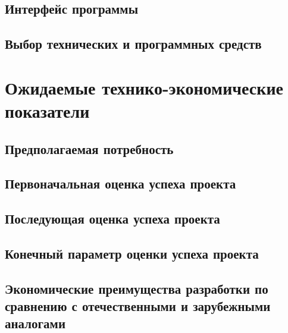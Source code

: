 \documentclass{article}
\begin{document}
    \subsection {Интерфейс программы}
    \subsection {Выбор технических и программных средств}
    \newpage
    \section {Ожидаемые технико-экономические показатели}
    \subsection {Предполагаемая потребность}
    \subsection {Первоначальная оценка успеха проекта}
    \subsection {Последующая оценка успеха проекта}
    \subsection {Конечный параметр оценки успеха проекта}
    \subsection {Экономические преимущества разработки по сравнению с отечественными и зарубежными аналогами}
    \newpage
\end{document}
